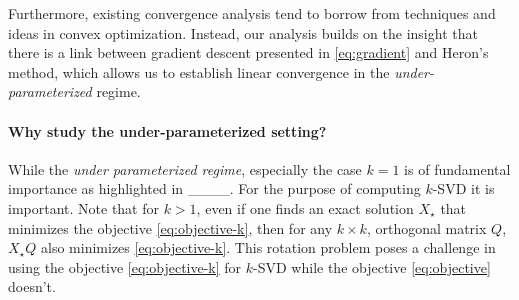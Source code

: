 Furthermore, existing convergence analysis tend to borrow from techniques and ideas in convex optimization. Instead, our analysis builds on the insight that there is a link between gradient descent presented in \eqref{eq:gradient} and Heron's method, which allows us to establish linear convergence in the \emph{under-parameterized} regime.  


\paragraph{Why study the under-parameterized setting?} While the \emph{under parameterized regime}, especially the case $k = 1$ is of fundamental importance as highlighted in ____. For the purpose of computing $k$-SVD it is important. Note that for $k > 1$, even if one finds an exact solution $X_\star$ that minimizes the objective \eqref{eq:objective-k}, then for any $k \times k$, orthogonal matrix $Q$, $X_\star Q$ also minimizes \eqref{eq:objective-k}. This rotation problem poses a challenge in using the objective \eqref{eq:objective-k} for $k$-SVD while the objective \eqref{eq:objective} doesn't.